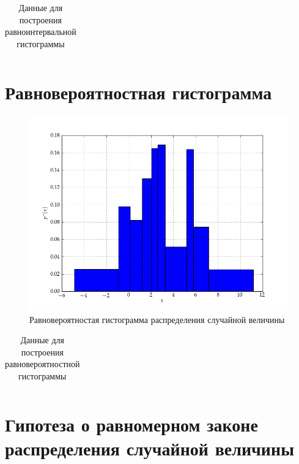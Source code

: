 \documentclass[a4paper,12pt]{report}
\begin{document}
\begin{table}[h!]
  \renewcommand{\tabcolsep}{1.6em}
  \centering
  \begin{tabular}{|c|c|c|c|c|c|c|}
    \hline %
    
  \end{tabular}
  \caption{Данные для построения равноинтервальной гистограммы}
\end{table}

\newpage

\section*{Равновероятностная гистограмма}

\begin{figure}[h!] 
  \centering
  \includegraphics[width=0.8\linewidth]{../pic/stat_series_eq_probability.png}
  \caption{Равновероятностая гистограмма распределения случайной величины}
\end{figure}

\begin{table}[h!]
  \renewcommand{\tabcolsep}{1.6em}
  \centering
  \begin{tabular}{|c|c|c|c|c|c|c|}
    \hline %
    
  \end{tabular}
  \caption{Данные для построения равновероятностной гистограммы}
\end{table}

\newpage

\section*{Гипотеза о равномерном законе \\
  распределения случайной величины}
\end{document}
